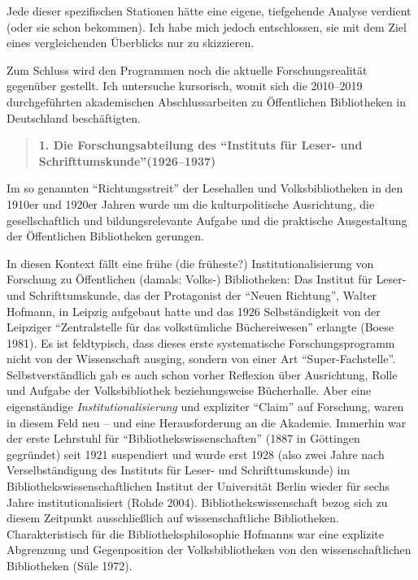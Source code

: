 \documentclass[a4paper,
fontsize=11pt,
oneside,
numbers=noperiodatend,
parskip=half-,
bibliography=totoc,
final
]{scrartcl}
\begin{document}
Jede dieser spezifischen Stationen hätte eine eigene, tiefgehende
Analyse verdient (oder sie schon bekommen). Ich habe mich jedoch
entschlossen, sie mit dem Ziel eines vergleichenden Überblicks nur zu
skizzieren.

Zum Schluss wird den Programmen noch die aktuelle Forschungsrealität
gegenüber gestellt. Ich untersuche kursorisch, womit sich die 2010--2019
durchgeführten akademischen Abschlussarbeiten zu Öffentlichen
Bibliotheken in Deutschland beschäftigten.

\begin{quote}
\textbf{1. Die Forschungsabteilung des \enquote{Instituts für Leser- und
Schrifttumskunde}\linebreak (1926--1937)}
\end{quote}

Im so genannten \enquote{Richtungsstreit} der Lesehallen und
Volksbibliotheken in den 1910er und 1920er Jahren wurde um die
kulturpolitische Ausrichtung, die gesellschaftlich und bildungsrelevante
Aufgabe und die praktische Ausgestaltung der Öffentlichen Bibliotheken
gerungen.

In diesen Kontext fällt eine frühe (die früheste?) Institutionalisierung
von Forschung zu Öffentlichen (damals: Volks-) Bibliotheken: Das
Institut für Leser- und Schrifttumskunde, das der Protagonist der
\enquote{Neuen Richtung}, Walter Hofmann, in Leipzig aufgebaut hatte und
das 1926 Selbständigkeit von der Leipziger \enquote{Zentralstelle für
das volkstümliche Büchereiwesen} erlangte (Boese 1981). Es ist
feldtypisch, dass dieses erste systematische Forschungsprogramm nicht
von der Wissenschaft ausging, sondern von einer Art
\enquote{Super-Fachstelle}. Selbstverständlich gab es auch schon vorher
Reflexion über Ausrichtung, Rolle und Aufgabe der Volksbibliothek
beziehungsweise Bücherhalle. Aber eine eigenständige
\emph{Institutionalisierung} und expliziter \enquote{Claim} auf
Forschung, waren in diesem Feld neu -- und eine Herausforderung an die
Akademie. Immerhin war der erste Lehrstuhl für
\enquote{Bibliothekswissenschaften} (1887 in Göttingen gegründet) seit
1921 suspendiert und wurde erst 1928 (also zwei Jahre nach
Verselbständigung des Instituts für Leser- und Schrifttumskunde) im
Bibliothekswissenschaftlichen Institut der Universität Berlin wieder für
sechs Jahre institutionalisiert (Rohde 2004). Bibliothekswissenschaft
bezog sich zu diesem Zeitpunkt ausschließlich auf wissenschaftliche
Bibliotheken. Charakteristisch für die Bibliotheksphilosophie Hofmanns
war eine explizite Abgrenzung und Gegenposition der Volksbibliotheken
von den wissenschaftlichen Bibliotheken (Süle 1972).
\end{document}
